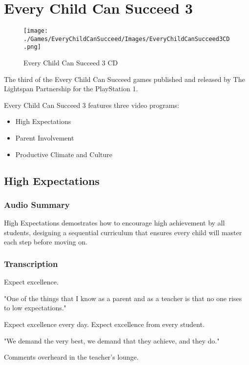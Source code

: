 \chapter{Every Child Can Succeed 3}

\begin{figure}[H]
    \centering
    \texttt{[image: ./Games/EveryChildCanSucceed/Images/EveryChildCanSucceed3CD.png]}
    \caption{Every Child Can Succeed 3 CD}
\end{figure}

The third of the Every Child Can Succeed games published and released by The Lightspan Partnership for the PlayStation 1.

Every Child Can Succeed 3 features three video programs:

\begin{itemize}
    \item High Expectations
    \item Parent Involvement
    \item Productive Climate and Culture
\end{itemize}

\clearpage
\newpage

\section{High Expectations}

\subsection{Audio Summary}

High Expectations demostrates how to encourage high achievement by all students, designing a sequential curriculum that ensures every child will master each step before moving on.

\subsection{Transcription}

Expect excellence.

"One of the things that I know as a parent and as a teacher is that no one rises to low expectations."

Expect excellence every day. Expect excellence from every student.

"We demand the very best, we demand that they achieve, and they do."

Comments overheard in the teacher's lounge.

